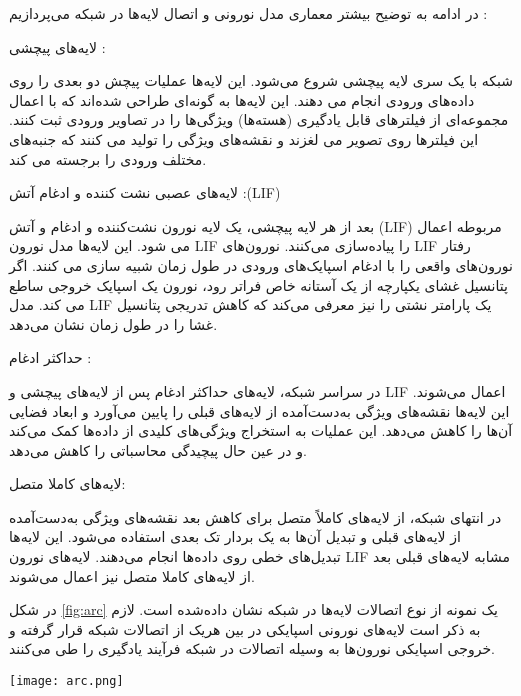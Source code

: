 در ادامه به توضیح بیشتر معماری مدل نورونی و اتصال لایه‌ها در شبکه می‌پردازیم :

لایه‌های پیچشی :

شبکه با یک سری لایه‌ پیچشی شروع می‌شود. این لایه‌ها عملیات پیچش دو بعدی را روی داده‌های ورودی انجام می دهند. این لایه‌ها به گونه‌ای طراحی شده‌اند که با اعمال مجموعه‌ای از فیلترهای قابل یادگیری (هسته‌ها) ویژگی‌ها را در تصاویر ورودی ثبت کنند. این فیلترها روی تصویر می لغزند و نقشه‌های ویژگی را تولید می کنند که جنبه‌های مختلف ورودی را برجسته می کند.
\citep{o2015introduction}

لایه‌های عصبی نشت کننده و ادغام آتش :(LIF)

بعد از هر لایه پیچشی، یک لایه نورون نشت‌کننده و ادغام و آتش (LIF) مربوطه اعمال می شود. این لایه‌ها مدل نورون LIF را پیاده‌سازی می‌کنند. نورون‌های LIF رفتار نورون‌های واقعی را با ادغام اسپایک‌های ورودی در طول زمان شبیه سازی می کنند. اگر پتانسیل غشای یکپارچه از یک آستانه خاص فراتر رود، نورون یک اسپایک خروجی ساطع می کند. مدل LIF یک پارامتر نشتی را نیز معرفی می‌کند که کاهش تدریجی پتانسیل غشا را در طول زمان نشان می‌دهد.


حداکثر ادغام :

در سراسر شبکه، لایه‌های حداکثر ادغام پس از لایه‌های پیچشی و LIF اعمال می‌شوند. این لایه‌ها نقشه‌های ویژگی به‌دست‌آمده از لایه‌های قبلی را پایین می‌آورد و ابعاد فضایی آن‌ها را کاهش می‌دهد. این عملیات به استخراج ویژگی‌های کلیدی از داده‌ها کمک می‌کند و در عین حال پیچیدگی محاسباتی را کاهش می‌دهد.


لایه‌های کاملا متصل:

در انتهای شبکه، از لایه‌های کاملاً متصل برای کاهش بعد نقشه‌های ویژگی به‌دست‌آمده از لایه‌های قبلی و تبدیل آن‌ها به یک بردار تک بعدی استفاده می‌شود. این لایه‌ها تبدیل‌های خطی روی داده‌ها انجام می‌دهند. لایه‌های نورون LIF مشابه لایه‌های قبلی بعد از لایه‌های کاملا متصل نیز اعمال می‌شوند.

در شکل  \ref{fig:arc} یک نمونه از نوع اتصالات لایه‌ها در شبکه نشان داده‌شده است. لازم به ذکر است لایه‌های نورونی اسپایکی در بین هریک از اتصالات شبکه قرار گرفته و خروجی اسپایکی نورون‌ها به وسیله اتصالات در شبکه فرآیند یادگیری را طی می‌کنند.

\begin{minipage}{\linewidth}
	\centering
	\texttt{[image: arc.png]}
	\captionsetup{font=small} %
	\label{fig:arc}
\end{minipage}





